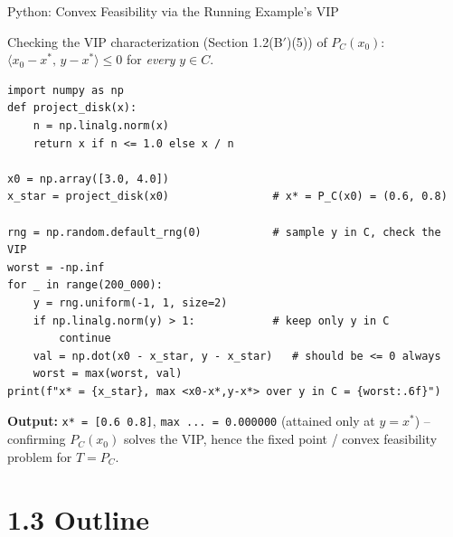 \documentclass[aspectratio=169,10pt]{beamer}
\begin{document}
\begin{frame}[fragile]{Python: Convex Feasibility via the Running Example's VIP}

Checking the VIP characterization (Section 1.2(B$'$)(5)) of $P_C(x_0)$:
$\langle x_0-x^*,\,y-x^*\rangle\le 0$ for \emph{every} $y\in C$.

\begin{lstlisting}
import numpy as np
def project_disk(x):
    n = np.linalg.norm(x)
    return x if n <= 1.0 else x / n

x0 = np.array([3.0, 4.0])
x_star = project_disk(x0)                # x* = P_C(x0) = (0.6, 0.8)

rng = np.random.default_rng(0)           # sample y in C, check the VIP
worst = -np.inf
for _ in range(200_000):
    y = rng.uniform(-1, 1, size=2)
    if np.linalg.norm(y) > 1:            # keep only y in C
        continue
    val = np.dot(x0 - x_star, y - x_star)   # should be <= 0 always
    worst = max(worst, val)
print(f"x* = {x_star}, max <x0-x*,y-x*> over y in C = {worst:.6f}")
\end{lstlisting}

\medskip
\textbf{Output:} \texttt{x* = [0.6 0.8]}, \texttt{max ... = 0.000000}
(attained only at $y=x^*$) -- confirming $P_C(x_0)$ solves the VIP, hence
the fixed point / convex feasibility problem for $T=P_C$.

\end{frame}

\section{1.3 Outline}
\end{document}
